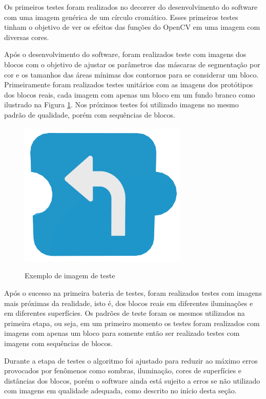     Os primeiros testes foram realizados no decorrer do desenvolvimento do software com uma imagem genérica de um círculo cromático. Esses primeiros testes tinham o objetivo de ver os efeitos das funções do OpenCV em uma imagem com diversas cores.
    
    Após o desenvolvimento do software, foram realizados teste com imagens dos blocos com o objetivo de ajustar os parâmetros das máscaras de segmentação por cor e os tamanhos das áreas mínimas dos contornos para se considerar um bloco. Primeiramente foram realizados testes unitários com as imagens dos protótipos dos blocos reais, cada imagem com apenas um bloco em um fundo branco como ilustrado na Figura \ref{figura:ex_teste}. Nos próximos testes foi utilizado imagens no mesmo padrão de qualidade, porém com sequências de blocos.
       
    \begin{figure}[H]
        \caption{Exemplo de imagem de teste}
        \centering
        \includegraphics[width=8cm]{Imagens/Cap3/Blocos/Virar.png}
        \label{figura:ex_teste}
    \end{figure}
    
    Após o sucesso na primeira bateria de testes, foram realizados testes com imagens mais próximas da realidade, isto é, dos blocos reais em diferentes iluminações e em diferentes superfícies. Os padrões de teste foram os mesmos utilizados na primeira etapa, ou seja, em um primeiro momento os testes foram realizados com imagens com apenas um bloco para somente então ser realizado testes com imagens com sequências de blocos.
    
    Durante a etapa de testes o algoritmo foi ajustado para reduzir ao máximo erros provocados por fenômenos como sombras, iluminação, cores de superfícies e distâncias dos blocos, porém o software ainda está sujeito a erros se não utilizado com imagens em qualidade adequada, como descrito no início desta seção.    


